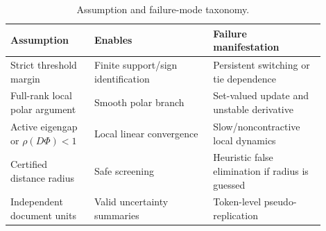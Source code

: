 \begin{table}[t]
\centering
\caption{Assumption and failure-mode taxonomy.}
\label{tab:a-assumptions}
\small
\begin{tabular}{p{0.24\linewidth}p{0.34\linewidth}p{0.32\linewidth}}
\toprule
Assumption & Enables & Failure manifestation \\
\midrule
Strict threshold margin & Finite support/sign identification & Persistent switching or tie dependence \\
Full-rank local polar argument & Smooth polar branch & Set-valued update and unstable derivative \\
Active eigengap or $\rho(D\Phi)<1$ & Local linear convergence & Slow/noncontractive local dynamics \\
Certified distance radius & Safe screening & Heuristic false elimination if radius is guessed \\
Independent document units & Valid uncertainty summaries & Token-level pseudo-replication \\
\bottomrule
\end{tabular}
\end{table}
